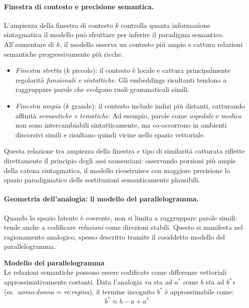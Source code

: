 \paragraph{Finestra di contesto e precisione semantica.}
L'ampiezza della finestra di contesto $k$ controlla quanta informazione sintagmatica il modello può sfruttare per inferire il paradigma semantico. All'aumentare di $k$, il modello osserva un contesto più ampio e cattura relazioni semantiche progressivamente più ricche.
\begin{itemize}
    \item \textit{Finestra stretta} ($k$ piccolo): il contesto è locale e cattura principalmente regolarità \textit{funzionali e sintattiche}. Gli embeddings risultanti tendono a raggruppare parole che svolgono ruoli grammaticali simili.
    \item \textit{Finestra ampia} ($k$ grande): il contesto include indizi più distanti, catturando affinità \textit{semantiche e tematiche}. Ad esempio, parole come \textit{ospedale} e \textit{medico} non sono intercambiabili sintatticamente, ma co-occorrono in ambienti discorsivi simili e risultano quindi vicine nello spazio vettoriale.
\end{itemize}
Questa relazione tra ampiezza della finestra e tipo di similarità catturata riflette direttamente il principio degli assi saussuriani: osservando porzioni più ampie della catena sintagmatica, il modello ricostruisce con maggiore precisione lo spazio paradigmatico delle sostituzioni semanticamente plausibili.
\paragraph{Geometria dell'analogia: il modello del parallelogramma.}
Quando lo spazio latente è coerente, non si limita a raggruppare parole simili: tende anche a codificare \textit{relazioni} come direzioni stabili. Questo si manifesta nel ragionamento analogico, spesso descritto tramite il cosiddetto modello del parallelogramma. 

\begin{notebox}
\textbf{Modello del parallelogramma}\\
Le relazioni semantiche possono essere codificate come differenze vettoriali approssimativamente costanti. Data l'analogia «$a$ sta ad $a^*$ come $b$ sta ad $b^*$» (es.\ \textit{uomo}:\textit{donna} = \textit{re}:\textit{regina}), il termine incognito $b^*$ è approssimabile come:
\[ b^* \approx b - a + a^* \]
\end{notebox}


